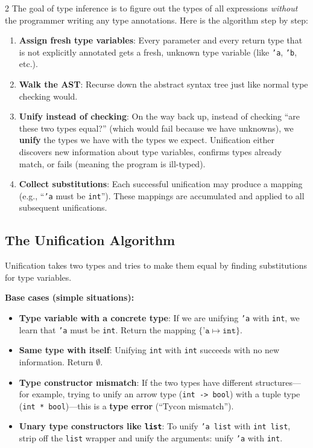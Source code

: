 \documentclass[9pt,landscape]{extarticle}
\begin{document}
\begin{multicols}{2}
The goal of type inference is to figure out the types of all expressions \emph{without} the programmer writing any type annotations. Here is the algorithm step by step:

\begin{enumerate}
  \item \textbf{Assign fresh type variables}: Every parameter and every return type that is not explicitly annotated gets a fresh, unknown type variable (like \texttt{'a}, \texttt{'b}, etc.).
  \item \textbf{Walk the AST}: Recurse down the abstract syntax tree just like normal type checking would.
  \item \textbf{Unify instead of checking}: On the way back up, instead of checking ``are these two types equal?'' (which would fail because we have unknowns), we \textbf{unify} the types we have with the types we expect. Unification either discovers new information about type variables, confirms types already match, or fails (meaning the program is ill-typed).
  \item \textbf{Collect substitutions}: Each successful unification may produce a mapping (e.g., ``\texttt{'a} must be \texttt{int}''). These mappings are accumulated and applied to all subsequent unifications.
\end{enumerate}

\subsection{The Unification Algorithm}

Unification takes two types and tries to make them equal by finding substitutions for type variables.

\textbf{Base cases (simple situations):}
\begin{itemize}
  \item \textbf{Type variable with a concrete type}: If we are unifying \texttt{'a} with \texttt{int}, we learn that \texttt{'a} must be \texttt{int}. Return the mapping $\{\texttt{'a} \mapsto \texttt{int}\}$.
  \item \textbf{Same type with itself}: Unifying \texttt{int} with \texttt{int} succeeds with no new information. Return $\emptyset$.
  \item \textbf{Type constructor mismatch}: If the two types have different structures---for example, trying to unify an arrow type (\texttt{int -> bool}) with a tuple type (\texttt{int * bool})---this is a \textbf{type error} (``Tycon mismatch'').
  \item \textbf{Unary type constructors like \texttt{list}}: To unify \texttt{'a list} with \texttt{int list}, strip off the \texttt{list} wrapper and unify the arguments: unify \texttt{'a} with \texttt{int}.
\end{itemize}


\end{multicols}
\end{document}
